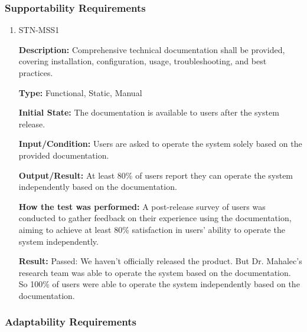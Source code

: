 \documentclass[12pt, titlepage]{article}
\begin{document}
\subsubsection{Supportability Requirements}

\begin{enumerate}

\item{STN-MSS1\\}

\textbf{Description:} Comprehensive technical documentation shall be provided, covering installation, configuration, usage, troubleshooting, and best practices.

\textbf{Type:} Functional, Static, Manual

\textbf{Initial State:} The documentation is available to users after the system release.

\textbf{Input/Condition:} Users are asked to operate the system solely based on the provided documentation.

\textbf{Output/Result:} At least 80\% of users report they can operate the system independently based on the documentation.

\textbf{How the test was performed:} A post-release survey of users was conducted to gather feedback on their experience using the documentation, aiming to achieve at least 80\% satisfaction in users' ability to operate the system independently.

\textbf{Result:} Passed: We haven't officially released the product. But Dr. Mahalec's research team was able to operate the system based on the documentation. So 100\% of users were able to operate the system independently based on the documentation.

\end{enumerate}

\subsubsection{Adaptability Requirements}
\end{document}
